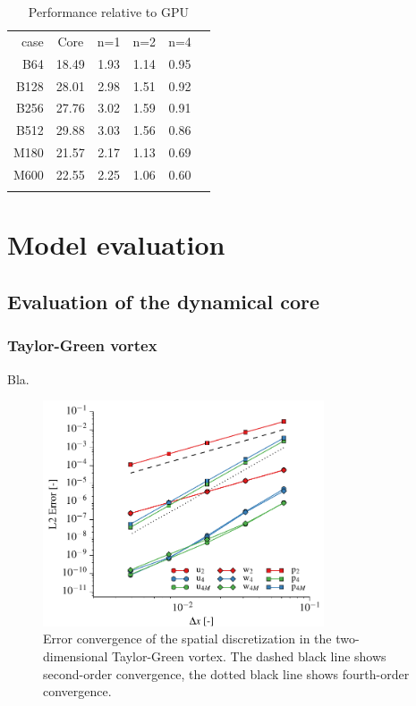 \documentclass[gmd]{copernicus}
\begin{document}
\begin{table}[t]
\caption{Performance relative to GPU}
\begin{tabular}{rccccc}
\tophline
case & Core & n=1  & n=2  & n=4   \\
\middlehline
B64  & 18.49 & 1.93 & 1.14 & 0.95 \\
B128 & 28.01 & 2.98 & 1.51 & 0.92 \\
B256 & 27.76 & 3.02 & 1.59 & 0.91 \\
B512 & 29.88 & 3.03 & 1.56 & 0.86 \\
\middlehline
M180 & 21.57 & 2.17 & 1.13 & 0.69 \\
M600 & 22.55 & 2.25 & 1.06 & 0.60 \\
\bottomhline
\end{tabular}
\end{table}

\section{Model evaluation}
\subsection{Evaluation of the dynamical core}
\subsubsection{Taylor-Green vortex}
Bla.
\begin{figure}[t]
\vspace*{2mm}
\begin{center}
\includegraphics[width=8.3cm]{figs/taylorgreen.pdf}
\end{center}
\caption{Error convergence of the spatial discretization in the two-dimensional Taylor-Green vortex. The dashed black line shows second-order convergence, the dotted black line shows fourth-order convergence.}
\end{figure}
\end{document}
